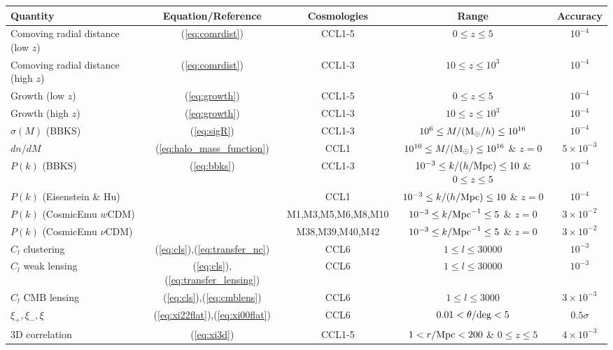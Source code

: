 
%
\begin{sidewaystable*}[!htp]
  \centering
  \begin{tabular}{ l|c c c c}
    \hline
    Quantity & Equation/Reference & Cosmologies & Range & Accuracy \\
    \hline
    Comoving radial distance (low $z$) & (\ref{eq:comrdist}) & CCL1-5 & $0\leq z\leq 5$ &  $10^{-4}$\\
    Comoving radial distance (high $z$) & (\ref{eq:comrdist}) & CCL1-3 & $10\leq z\leq 10^3$ &  $10^{-4}$\\
    Growth (low $z$) & (\ref{eq:growth}) & CCL1-5 &  $0\leq z\leq 5 $ &  $10^{-4}$\\
    Growth (high $z$) & (\ref{eq:growth}) & CCL1-3 & $10\leq z\leq 10^3$ &  $10^{-4}$\\
    $\sigma(M)$ (BBKS) & (\ref{eq:sigR}) & CCL1-3 &  $10^6\leq M/({\rm M}_\odot/h)\leq 10^{16}$ &  $10^{-4}$\\
    $dn/dM$ & (\ref{eq:halo_mass_function}) & CCL1 & $10^{10}\leq M/({\rm M}_\odot)\leq 10^{16}$ \& $z=0$ & $5\times 10^{-3}$\\
    $P(k)$ (BBKS) & (\ref{eq:bbks}) & CCL1-3 & $10^{-3}\leq k/(h/{\rm Mpc})\leq 10$ \& $0\leq z\leq 5$ &  $10^{-4}$\\
    $P(k)$ (Eisenstein \& Hu) & \citet{1998ApJ...496..605E}  & CCL1 & $10^{-3}\leq k/(h/{\rm Mpc})\leq 10$ \& $z=0$ & $10^{-4}$ \\
    $P(k)$ (CosmicEmu $w$CDM) & \citet{Lawrence17} & M1,M3,M5,M6,M8,M10 & $10^{-3}\leq k/{\rm Mpc}^{-1}\leq 5$ \& $z=0$  & $3\times 10^{-2}$ \\
    $P(k)$ (CosmicEmu $\nu$CDM) & \citet{Lawrence17} & M38,M39,M40,M42 & $10^{-3}\leq k/{\rm Mpc}^{-1}\leq 5$ \& $z=0$ & $3\times 10^{-2}$ \\
    $C_l$ clustering & (\ref{eq:cls}),(\ref{eq:transfer_nc})& CCL6 &$1 \leq l\leq 30000$ &  $10^{-3}$\\
    $C_l$ weak lensing & (\ref{eq:cls}),(\ref{eq:transfer_lensing})& CCL6 &$1 \leq l\leq 30000$ &  $10^{-3}$\\
    $C_l$ CMB lensing &(\ref{eq:cls}),(\ref{eq:cmblens}) & CCL6 & $1 \leq l\leq 3000$& $3\times 10^{-3}$ \\
    $\xi_+,\xi_-,\xi$ & (\ref{eq:xi22flat}),(\ref{eq:xi00flat}) & CCL6 & $0.01< \theta/{\rm deg}< 5$&  $0.5\sigma$\\
    3D correlation & (\ref{eq:xi3d}) & CCL1-5 & $1<r/{\rm Mpc}<200$ \& $0 \leq z \leq 5$& $4\times 10^{-3}$  \\

\end{tabular}
\end{sidewaystable*}
